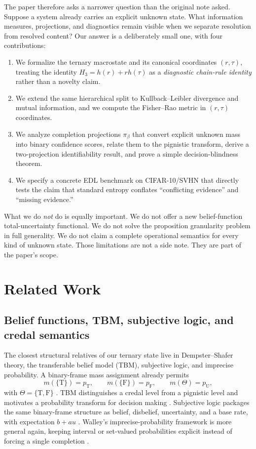 \documentclass[11pt]{article}
\newcommand{\T}{\mathrm{T}}
\newcommand{\F}{\mathrm{F}}
\newcommand{\U}{\mathrm{U}}
\newcommand{\1}{\mathbf{1}}
\begin{document}
The paper therefore asks a narrower question than the original note asked. Suppose a system already carries an explicit unknown state. What information measures, projections, and diagnostics remain visible when we separate resolution from resolved content? Our answer is a deliberately small one, with four contributions:
\begin{enumerate}[leftmargin=1.5em]
    \item We formalize the ternary macrostate and its canonical coordinates $(r,\tau)$, treating the identity $H_3=h(r)+rh(\tau)$ as a \emph{diagnostic chain-rule identity} rather than a novelty claim.
    \item We extend the same hierarchical split to Kullback--Leibler divergence and mutual information, and we compute the Fisher--Rao metric in $(r,\tau)$ coordinates.
    \item We analyze completion projections $\pi_\beta$ that convert explicit unknown mass into binary confidence scores, relate them to the pignistic transform, derive a two-projection identifiability result, and prove a simple decision-blindness theorem.
    \item We specify a concrete EDL benchmark on CIFAR-10/SVHN that directly tests the claim that standard entropy conflates “conflicting evidence” and “missing evidence.”
\end{enumerate}

What we do \emph{not} do is equally important. We do not offer a new belief-function total-uncertainty functional. We do not solve the proposition granularity problem in full generality. We do not claim a complete operational semantics for every kind of unknown state. Those limitations are not a side note. They are part of the paper's scope.

\section{Related Work}

\subsection{Belief functions, TBM, subjective logic, and credal semantics}

The closest structural relatives of our ternary state live in Dempster--Shafer theory, the transferable belief model (TBM), subjective logic, and imprecise probability. A binary-frame mass assignment already permits
\[
 m(\{\T\})=p_\T,
 \qquad
 m(\{\F\})=p_\F,
 \qquad
 m(\Theta)=p_\U,
\]
with $\Theta=\{\T,\F\}$ \citep{Dempster67,Shafer76}. TBM distinguishes a credal level from a pignistic level and motivates a probability transform for decision making \citep{SmetsKennes94,Smets90}. Subjective logic packages the same binary-frame structure as belief, disbelief, uncertainty, and a base rate, with expectation $b+a u$ \citep{Josang16}. Walley's imprecise-probability framework is more general again, keeping interval or set-valued probabilities explicit instead of forcing a single completion \citep{Walley91}. 
\end{document}
